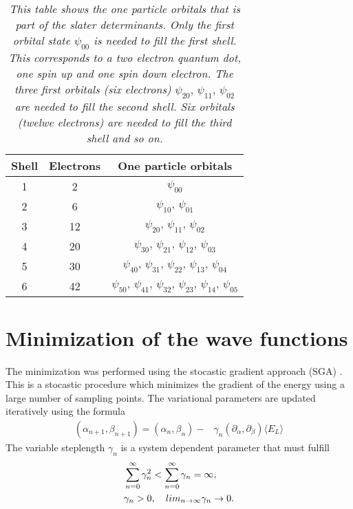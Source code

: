 \documentclass[a4paper,10pt,twocolumn]{article} %
\newcommand{\expec}[1]{\langle{}{#1}\rangle{}}
\begin{document}
\begin{table}
\begin{center}
\begin{tabular}{|c|c|c|}
\hline
Shell& Electrons & One particle orbitals \\
\hline
1&2& $\psi_{00}$ \\
2&6& $\psi_{10},\,\psi_{01}$\\
3&12& $\psi_{20},\,\psi_{11},\,\psi_{02}$\\
4&20& $\psi_{30},\,\psi_{21},\,\psi_{12},\,\psi_{03}$\\
5&30& $\psi_{40},\,\psi_{31},\,\psi_{22},\,\psi_{13},\,\psi_{04}$\\
6&42& $\psi_{50},\,\psi_{41},\,\psi_{32},\,\psi_{23},\,\psi_{14},\,\psi_{05}$\\
\hline
\end{tabular}
\caption{\it 
	This table shows the one particle orbitals that is part of the slater determinants. Only the first orbital state $\psi_{00}$ 
	is needed to fill the first shell. This corresponds to a two electron quantum dot, one spin up and one spin down electron. The
	three first orbitals (six electrons) $\psi_{20},\,\psi_{11},\,\psi_{02}$ are needed to fill the second shell. Six orbitals (twelwe electrons) are needed to fill the third shell and so on.
\label{tab:orb}
}
\label{tab0}
\end{center}
\end{table}






\section{Minimization of the wave functions}%

The minimization was performed using the stocastic gradient approach (SGA) \cite{harju_1997,harju_2005,nissenbaum_2008}. 
This is a stocastic procedure which minimizes the gradient of the energy using a large number of sampling points.
The variational parameters are updated iteratively using the formula
\begin{align}
	(\alpha_{n+1},\beta_{n+1})=	(\alpha_{n},\beta_{n}) -
	&\gamma_n\left({\partial_\alpha},{\partial_\beta}\right) \expec{E_L}\label{eq:sga1}
\end{align}
The variable steplength $\gamma_n$ is a system dependent parameter that must fulfill
\begin{align}
&	\sum_{n=0}^\infty \gamma_n^2 <
	\sum_{n=0}^\infty \gamma_n = \infty,\notag\\
    &\gamma_n>0,\quad
	lim_{n\to\infty}\gamma_n\to0.\label{eq:sga2}
\end{align}
\end{document}
